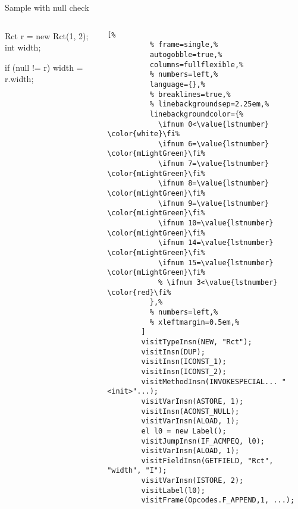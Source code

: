 \begin{frame}[fragile]{Sample with null check}
  \begin{columns}
    \begin{column}{0.35\textwidth}
      \begin{Java}[%
          linebackgroundcolor={%
            \ifnum 0<\value{lstnumber} \color{white}\fi%
            \ifnum 4=\value{lstnumber} \color{mLightGreen}\fi%
          },%
        ]
        Rct r = new Rct(1, 2);
        int width;

        if (null != r)
            width = r.width;
      \end{Java}
    \end{column}
    \begin{column}{0.60\textwidth}
      \small
      \begin{lstlisting}[%
          % frame=single,%
          autogobble=true,%
          columns=fullflexible,%
          % numbers=left,%
          language={},%
          % breaklines=true,%
          % linebackgroundsep=2.25em,%
          linebackgroundcolor={%
            \ifnum 0<\value{lstnumber} \color{white}\fi%
            \ifnum 6=\value{lstnumber} \color{mLightGreen}\fi%
            \ifnum 7=\value{lstnumber} \color{mLightGreen}\fi%
            \ifnum 8=\value{lstnumber} \color{mLightGreen}\fi%
            \ifnum 9=\value{lstnumber} \color{mLightGreen}\fi%
            \ifnum 10=\value{lstnumber} \color{mLightGreen}\fi%
            \ifnum 14=\value{lstnumber} \color{mLightGreen}\fi%
            \ifnum 15=\value{lstnumber} \color{mLightGreen}\fi%
            % \ifnum 3<\value{lstnumber} \color{red}\fi%
          },%
          % numbers=left,%
          % xleftmargin=0.5em,%
        ]
        visitTypeInsn(NEW, "Rct");
        visitInsn(DUP);
        visitInsn(ICONST_1);
        visitInsn(ICONST_2);
        visitMethodInsn(INVOKESPECIAL... "<init>"...);
        visitVarInsn(ASTORE, 1);
        visitInsn(ACONST_NULL);
        visitVarInsn(ALOAD, 1);
        el l0 = new Label();
        visitJumpInsn(IF_ACMPEQ, l0);
        visitVarInsn(ALOAD, 1);
        visitFieldInsn(GETFIELD, "Rct", "width", "I");
        visitVarInsn(ISTORE, 2);
        visitLabel(l0);
        visitFrame(Opcodes.F_APPEND,1, ...);
      \end{lstlisting}
    \end{column}
  \end{columns}
\end{frame}

